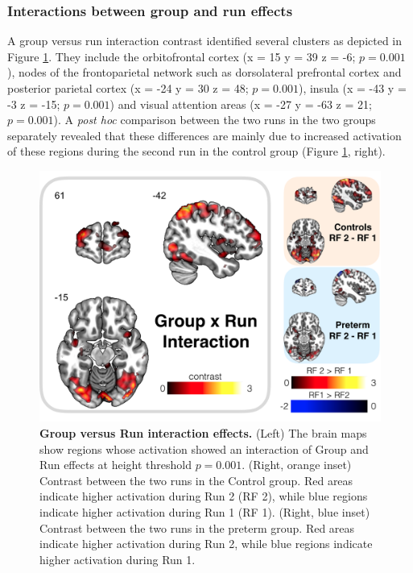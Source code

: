 \vspace{0.5cm}
\subsubsection{Interactions between group and run effects}

A group versus run interaction contrast identified several clusters as depicted in Figure \ref{fig:Interaction}. They include the orbitofrontal cortex (x = 15 y = 39  z = -6; $p = 0.001$), nodes of the frontoparietal network such as dorsolateral prefrontal cortex and posterior parietal cortex (x = -24 y = 30  z = 48; $p = 0.001$), insula (x = -43 y = -3  z = -15; $p = 0.001$) and visual attention areas (x = -27 y = -63  z = 21; $p = 0.001$). A \textit{post hoc} comparison between the two runs in the two groups separately revealed that these differences are mainly due to increased activation of these regions during the second run in the control group (Figure \ref{fig:Interaction}, right).

\begin{figure}[h]
\vspace{3mm}
\centering\includegraphics[width=1\linewidth]{images/Ch4/Ch4_CtrlVsPre_interaction.png}
\caption{\textbf{Group versus Run interaction effects.} (Left) The brain maps show regions whose activation showed an interaction of Group and Run effects at height threshold $p = 0.001$. (Right, orange inset) Contrast between the two runs in the Control group. Red areas indicate higher activation during Run 2 (RF 2), while blue regions indicate higher activation during Run 1 (RF 1). (Right, blue inset) Contrast between the two runs in the preterm group. Red areas indicate higher activation during Run 2, while blue regions indicate higher activation during Run 1.}
 \label{fig:Interaction}
\end{figure}


